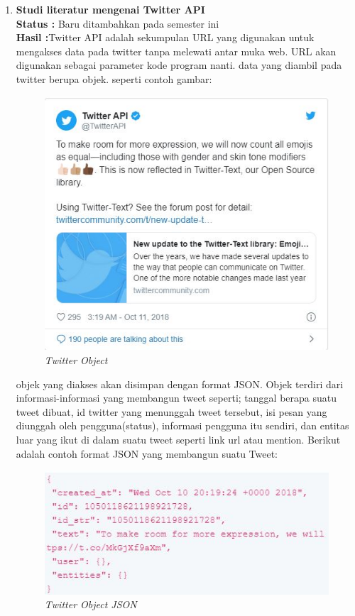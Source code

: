 \documentclass[a4paper,twoside]{article}
\begin{document}
\begin{enumerate}
		\item \textbf{Studi literatur mengenai Twitter API}\\
		{\bf Status :} Baru ditambahkan pada semester ini\\
		{\bf Hasil :}Twitter API adalah sekumpulan URL yang digunakan untuk mengakses data pada twitter tanpa melewati
antar muka web. URL akan digunakan sebagai parameter kode program nanti. data yang diambil pada twitter berupa objek. seperti contoh gambar:

\begin{figure}[H] 
	\centering  
	\includegraphics[scale=0.8]{twitter-object}  
	\caption[Gambar Twitter Object]{\textit{Twitter Object}} 
	\label{fig:Hadoop-home} 
\end{figure}

objek yang diakses akan disimpan dengan format JSON. Objek terdiri dari informasi-informasi yang membangun tweet seperti; tanggal berapa suatu tweet dibuat, id twitter yang menunggah tweet tersebut, isi pesan yang diunggah oleh pengguna(status), informasi pengguna itu sendiri, dan entitas luar yang ikut di dalam suatu tweet seperti link url atau mention. Berikut adalah contoh format JSON yang membangun suatu Tweet:

\begin{figure}[H] 
	\centering  
	\includegraphics[scale=1]{twitterJSON}  
	\caption[Gambar Twitter Object]{\textit{Twitter Object JSON}} 
	\label{fig:Hadoop-home} 
\end{figure}


\end{enumerate}
\end{document}
